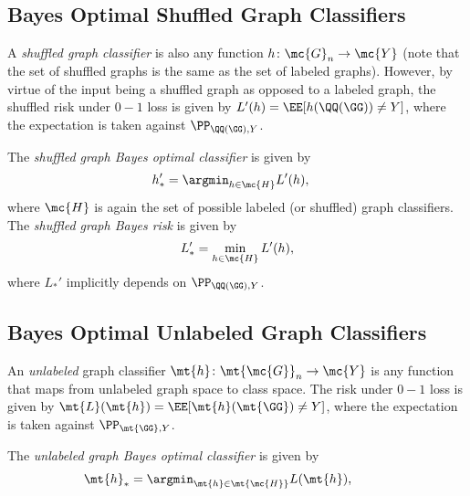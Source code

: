 \documentclass[10pt,journal,cspaper,compsoc]{IEEEtran}
\begin{document}
\subsection{Bayes Optimal Shuffled Graph Classifiers} %

A \emph{shuffled graph classifier} is also any function $h\colon \mc{G}_n \to \mc{Y}$ (note that the set of shuffled graphs is the same as the set of labeled graphs). However, by virtue of the input being a shuffled graph as opposed to a labeled graph, the shuffled risk under $0-1$ loss is given by $L'(h)=\EE[h(\QQ(\GG)) \neq Y]$, where the expectation is taken against $\PP_{\QQ(\GG),Y}$. %

The \emph{shuffled graph Bayes optimal classifier} is given by
\begin{align}
	h_*' &= \argmin_{h \in \mc{H}} L'(h), %
\end{align}
where $\mc{H}$ is again the set of possible labeled (or shuffled) graph classifiers. The \emph{shuffled graph Bayes risk} is given by
\begin{align}
	L_*' =\min_{h \in \mc{H}} L'(h),
\end{align}
where  $L_*'$ implicitly depends on $\PP_{\QQ(\GG),Y}$.  %

\subsection{Bayes Optimal Unlabeled Graph Classifiers} %


An \emph{unlabeled} graph classifier $\mt{h}\colon \mt{\mc{G}}_n \to \mc{Y}$ is any function that maps from unlabeled graph space to class space. The risk under $0-1$ loss is given by $\mt{L}(\mt{h})=\EE[\mt{h}(\mt{\GG})\neq Y]$, where the expectation is taken against $\PP_{\mt{\GG},Y}$. 

The \emph{unlabeled graph Bayes optimal classifier} is given by %
\begin{align}
	\mt{h}_* &= \argmin_{\mt{h} \in \mt{\mc{H}}} L(\mt{h}), \qquad %
\end{align}
\end{document}
